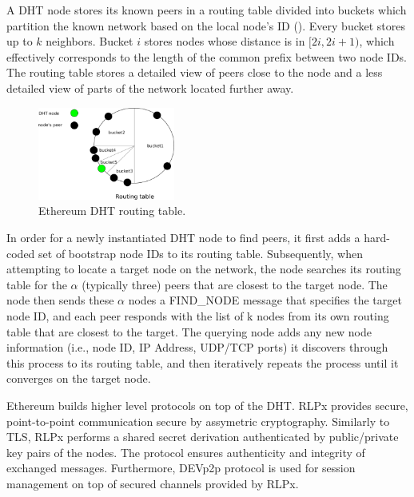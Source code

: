 A DHT node stores its known peers in a routing table divided into buckets which partition the known network based on the local node’s ID (). Every bucket stores up to $k$ neighbors. Bucket $i$ stores nodes whose distance is in $[2i, 2i+1)$, which effectively corresponds to the length of the common prefix between two node IDs. The routing table stores a detailed view of peers close to the node and a less detailed view of parts of the network located further away.


\begin{figure}
    \includegraphics[width=0.4\textwidth]{img/kademlia}
    \caption{Ethereum DHT routing table.}
    \label{fig:kademlia}
 \end{figure}
 
In order for a newly instantiated DHT node to find peers, it first adds a hard-coded set of bootstrap node IDs to its routing table. Subsequently, when attempting to locate a target node on the network, the node searches its routing table for the $\alpha$ (typically three) peers that are closest to the target node. The node then sends these $\alpha$ nodes a FIND\_NODE message that specifies the target node ID, and each peer responds with the list of k nodes from its own routing table that are closest to the target. The querying node adds any new node information (i.e., node ID, IP Address, UDP/TCP ports) it discovers through this process to its routing table, and then iteratively repeats the process until it converges on the target node.
 
 Ethereum builds higher level protocols on top of the DHT. RLPx provides secure, point-to-point communication secure by assymetric cryptography. Similarly to TLS, RLPx performs a shared secret derivation authenticated by public/private key pairs of the nodes. The protocol ensures authenticity and integrity of exchanged messages. Furthermore, DEVp2p protocol is used for session management on top of secured channels provided by RLPx. 
 
